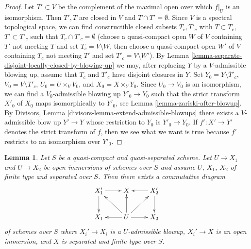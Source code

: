 \documentclass{amsart}
\theoremstyle{plain}
\newtheorem{lemma}[subsection]{Lemma}
\theoremstyle{definition}
\theoremstyle{remark}
\numberwithin{equation}{subsection}
\begin{document}
\begin{proof}
Let $T' \subset V$ be the complement of the maximal open over which
$f|_U$ is an isomorphism. Then $T', T$ are closed in $V$ and
$T \cap T' = \emptyset$. Since $V$ is a spectral topological
space, we can find constructible closed subsets $T_c, T'_c$
with $T \subset T_c$, $T' \subset T'_c$ such that
$T_c \cap T'_c = \emptyset$ (choose a quasi-compact
open $W$ of $V$ containing $T'$ not meeting $T$
and set $T_c = V \setminus W$, then choose a quasi-compact
open $W'$ of $V$ containing $T_c$ not meeting $T'$
and set $T'_c = V \setminus W'$).
By Lemma \ref{lemma-separate-disjoint-locally-closed-by-blowing-up}
we may, after replacing $Y$ by a $V$-admissible blowing up,
assume that $T_c$ and $T'_c$ have disjoint closures in $Y$.
Set $Y_0 = Y \setminus \overline{T}'_c$, $V_0 = V \setminus T'_c$,
$U_0 = U \times_V V_0$, and $X_0 = X \times_Y Y_0$.
Since $U_0 \to V_0$ is an isomorphism, we can find a
$V_0$-admissible blowing up $Y'_0 \to Y_0$ such that the
strict transform $X'_0$ of $X_0$ maps isomorphically to $Y'_0$, see
Lemma \ref{lemma-zariski-after-blowup}.
By Divisors, Lemma \ref{divisors-lemma-extend-admissible-blowups}
there exists a $V$-admissible blow up $Y' \to Y$ whose restriction
to $Y_0$ is $Y'_0 \to Y_0$. If $f' : X' \to Y'$ denotes the
strict transform of $f$, then we see what we want is true because
$f'$ restricts to an isomorphism over $Y'_0$.
\end{proof}


\begin{lemma}
\label{lemma-find-common-blowups}
Let $S$ be a quasi-compact and quasi-separated scheme.
Let $U \to X_1$ and $U \to X_2$ be open immersions
of schemes over $S$ and assume $U$, $X_1$, $X_2$ of finite
type and separated over $S$. Then there exists a commutative diagram
$$
\xymatrix{
X_1' \ar[d] \ar[r] & X & X_2' \ar[l] \ar[d] \\
X_1 & U \ar[l] \ar[lu] \ar[u] \ar[ru] \ar[r] & X_2
}
$$
of schemes over $S$ where $X_i' \to X_i$ is a $U$-admissible
blowup, $X_i' \to X$ is an open immersion, and $X$ is separated and finite
type over $S$.
\end{lemma}
\end{document}
